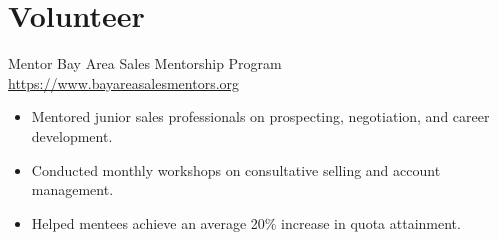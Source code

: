 \documentclass[a4paper, serif, 10pt]{moderncv}
\begin{document}
\section{Volunteer}

        {Mentor}
        {Bay Area Sales Mentorship Program}
        {\url{https://www.bayareasalesmentors.org}}
        {}
        {\begin{itemize}
\item Mentored junior sales professionals on prospecting, negotiation, and career development.
\item Conducted monthly workshops on consultative selling and account management.
\item Helped mentees achieve an average 20\% increase in quota attainment.
\end{itemize}}
    
\end{document}
